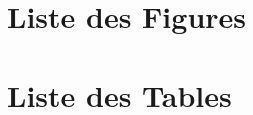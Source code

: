 \documentclass[11pt, openright]{book}
\begin{document}



































\newpage
\section{Liste des Figures}\lofwithouttitle
\section{Liste des Tables}\lotwithouttitle
\end{document}
